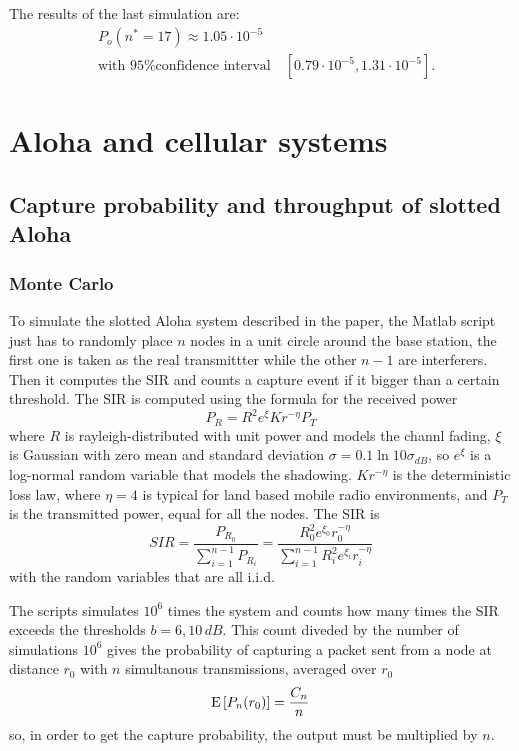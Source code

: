 \documentclass[a4paper,oneside]{article}
\begin{document}
The results of the last simulation are:
\begin{align*}
  & P_o(n^* = 17) \approx 1.05 \cdot 10^{-5} \\
  & \text{with 95\% confidence interval} \quad [0.79 \cdot 10^{-5}, 1.31 \cdot 10^{-5}] .
\end{align*}
\section{Aloha and cellular systems}
\subsection*{Capture probability and throughput of slotted Aloha}
\subsubsection*{Monte Carlo}
To simulate the slotted Aloha system described in the paper, the
Matlab script just has to randomly place $n$ nodes in a unit circle
around the base station, the first one is taken as the real
transmittter while the other $n-1$ are interferers. Then it computes
the SIR and counts a capture event if it bigger than a certain
threshold.
%
The SIR is computed using the formula for the received power
\begin{equation}
  P_R = R^2e^\xi Kr^{-\eta}P_T
\end{equation}
where $R$ is rayleigh-distributed with unit power and models the
channl fading, $\xi$ is Gaussian with zero mean and standard deviation
$\sigma = 0.1 \ln10 \sigma_{dB}$, so $e^\xi$ is a log-normal random
variable that models the shadowing. $Kr^{-\eta}$ is the deterministic
loss law, where $\eta = 4$ is typical for land based mobile radio
environments, and $P_T$ is the transmitted power, equal for all the
nodes.
%
The SIR is
\begin{equation}
  SIR = \frac{P_{R_0}}{\sum_{i=1}^{n-1} P_{R_i}} =
  \frac{R_0^2 e^{\xi_0} r_0^{-\eta}}{\sum_{i=1}^{n-1} R_i^2 e^{\xi_i} r_i^{-\eta}}
  \label{eq:SIR}
\end{equation}
with the random variables that are all i.i.d.

The scripts simulates $10^6$ times the system and counts how many
times the SIR exceeds the thresholds $b = 6, 10 \, \si{dB}$. This count
diveded by the number of simulations $10^6$ gives the probability of
capturing a packet sent from a node at distance $r_0$ with $n$
simultanous transmissions, averaged over $r_0$
\begin{equation}
  \operatorname{E}\left[P_n(r_0)\right] = \frac{C_n}{n}
\end{equation}
so, in order to get the capture probability, the output must be
multiplied by $n$.
\end{document}
